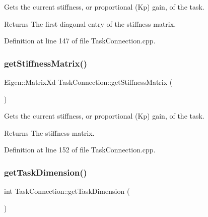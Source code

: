 Gets the current stiffness, or proportional (Kp) gain, of the task.

\begin{DoxyReturn}{Returns}
The first diagonal entry of the stiffness matrix. 
\end{DoxyReturn}


Definition at line 147 of file Task\+Connection.\+cpp.

\hypertarget{classocra__recipes_1_1TaskConnection_abbcaa5c1769afc4e4074486fe4fb319a}{}\label{classocra__recipes_1_1TaskConnection_abbcaa5c1769afc4e4074486fe4fb319a} 
\subsubsection{\texorpdfstring{get\+Stiffness\+Matrix()}{getStiffnessMatrix()}}
{\footnotesize\ttfamily Eigen\+::\+Matrix\+Xd Task\+Connection\+::get\+Stiffness\+Matrix (\begin{DoxyParamCaption}{ }\end{DoxyParamCaption})}

Gets the current stiffness, or proportional (Kp) gain, of the task.

\begin{DoxyReturn}{Returns}
The stiffness matrix. 
\end{DoxyReturn}


Definition at line 152 of file Task\+Connection.\+cpp.

\hypertarget{classocra__recipes_1_1TaskConnection_a14a0075a94a7df0f912b7dbd8f56d8e2}{}\label{classocra__recipes_1_1TaskConnection_a14a0075a94a7df0f912b7dbd8f56d8e2} 
\subsubsection{\texorpdfstring{get\+Task\+Dimension()}{getTaskDimension()}}
{\footnotesize\ttfamily int Task\+Connection\+::get\+Task\+Dimension (\begin{DoxyParamCaption}{ }\end{DoxyParamCaption})}



